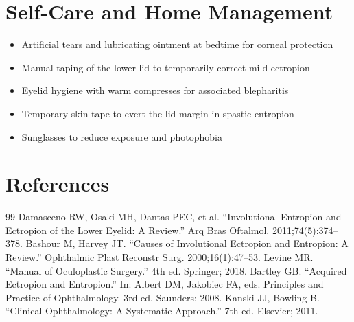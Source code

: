 \section*{Self-Care and Home Management}
\begin{itemize}
  \item Artificial tears and lubricating ointment at bedtime for corneal protection
  \item Manual taping of the lower lid to temporarily correct mild ectropion
  \item Eyelid hygiene with warm compresses for associated blepharitis
  \item Temporary skin tape to evert the lid margin in spastic entropion
  \item Sunglasses to reduce exposure and photophobia
\end{itemize}

\section*{References}
\begin{thebibliography}{99}
 Damasceno RW, Osaki MH, Dantas PEC, et al. ``Involutional Entropion and Ectropion of the Lower Eyelid: A Review.'' Arq Bras Oftalmol. 2011;74(5):374--378.
 Bashour M, Harvey JT. ``Causes of Involutional Ectropion and Entropion: A Review.'' Ophthalmic Plast Reconstr Surg. 2000;16(1):47--53.
 Levine MR. ``Manual of Oculoplastic Surgery.'' 4th ed. Springer; 2018.
 Bartley GB. ``Acquired Ectropion and Entropion.'' In: Albert DM, Jakobiec FA, eds. Principles and Practice of Ophthalmology. 3rd ed. Saunders; 2008.
 Kanski JJ, Bowling B. ``Clinical Ophthalmology: A Systematic Approach.'' 7th ed. Elsevier; 2011.
\end{thebibliography}
